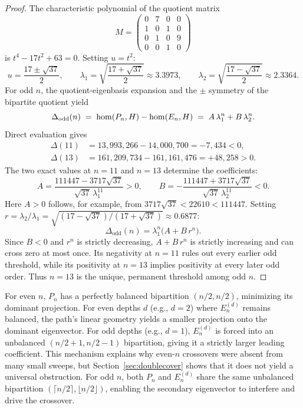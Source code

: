 \begin{proof}
  The characteristic polynomial of the quotient matrix
  \[
    M = \begin{pmatrix} 0&7&0&0 \\ 1&0&1&0 \\
    0&1&0&9 \\ 0&0&1&0 \end{pmatrix}
  \]
  is $t^4 - 17t^2 + 63 = 0$. Setting $u = t^2$:
  \[
    u = \frac{17 \pm \sqrt{37}}{2},
    \qquad
    \lambda_1 = \sqrt{\frac{17 + \sqrt{37}}{2}} \approx 3.3973,
    \qquad
    \lambda_2 = \sqrt{\frac{17 - \sqrt{37}}{2}} \approx 2.3364.
  \]
  For odd $n$, the quotient-eigenbasis expansion and the $\pm$ symmetry
  of the bipartite quotient yield
  \[
    \Delta_{\mathrm{odd}}(n) \;=\; \mathrm{hom}(P_n, H) - \mathrm{hom}(E_n, H)
    \;=\; A\,\lambda_1^n + B\,\lambda_2^n.
  \]
  Direct evaluation gives
  \begin{align*}
    \Delta(11) &= 13{,}993{,}266 - 14{,}000{,}700 = -7{,}434 < 0, \\
    \Delta(13) &= 161{,}209{,}734 - 161{,}161{,}476 = +48{,}258 > 0.
  \end{align*}
  The two exact values at $n=11$ and $n=13$ determine the coefficients:
  \[
    A=\frac{111447-3717\sqrt{37}}{\sqrt{37}\,\lambda_1^{11}}>0,
    \qquad
    B=-\frac{111447+3717\sqrt{37}}{\sqrt{37}\,\lambda_2^{11}}<0.
  \]
  Here $A>0$ follows, for example, from
  $3717\sqrt{37}<22610<111447$. Setting
  $r = \lambda_2 / \lambda_1 = \sqrt{(17 - \sqrt{37})/(17 + \sqrt{37})}
  \approx 0.6877$:
  \[
    \Delta_{\mathrm{odd}}(n) = \lambda_1^n \bigl(A + B\,r^n\bigr).
  \]
  Since $B<0$ and $r^n$ is strictly decreasing, $A+B\,r^n$ is strictly
  increasing and can cross zero at most once. Its negativity at $n=11$
  rules out every earlier odd threshold, while its positivity at $n=13$
  implies positivity at every later odd order. Thus $n = 13$ is the
  unique, permanent threshold among odd $n$.
\end{proof}

\begin{remark}
  \label{rem:parity}
  For even $n$, $P_n$ has a perfectly balanced bipartition $(n/2, n/2)$,
  minimizing its dominant projection. For even depths $d$ (e.g., $d=2$)
  where $E_n^{(d)}$ remains balanced, the path's linear geometry yields
  a smaller projection onto the dominant eigenvector. For odd depths
  (e.g., $d=1$), $E_n^{(d)}$ is forced into an unbalanced
  $(n/2+1, n/2-1)$ bipartition, giving it a strictly larger leading
  coefficient. This mechanism explains why even-$n$ crossovers were absent
  from many small sweeps, but Section~\ref{sec:doublecover} shows that it
  does not yield a universal obstruction. For odd $n$, both $P_n$ and $E_n^{(d)}$ share the same
  unbalanced bipartition $(\lceil n/2 \rceil, \lfloor n/2 \rfloor)$,
  enabling the secondary eigenvector to interfere and drive the crossover.
\end{remark}


